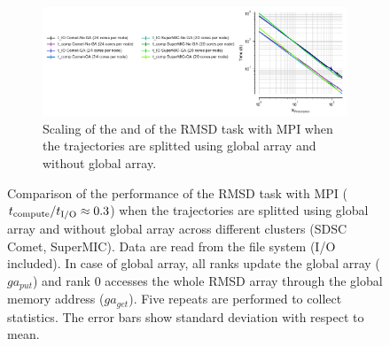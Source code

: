 \begin{figure}[ht!]
\begin{subfigure} {.8\textwidth}
  \includegraphics[width=\linewidth]{figures/Clusters_IO_compute_scaling_splitting.pdf}
  \caption{Scaling of the \tcomp and \tIO of the RMSD task with MPI when the trajectories are splitted using global array and without global array.}
  \label{fig:compute-IO-scaling-clusters-splitting}
\end{subfigure}
%
\caption{Comparison of the performance of the RMSD task with MPI (${t}_{\text{compute}}/{t}_{\text{I/O}} \approx 0.3$) when the trajectories are splitted using global 
array and without global array across different clusters (SDSC Comet, SuperMIC). Data are read from the file system (I/O included).
In case of global array, all ranks update the global array ($ga_{put}$) and rank 0 accesses the whole RMSD array through the global memory address ($ga_{get}$).
Five repeats are performed to collect statistics. The error bars show standard deviation with respect to mean. }
\label{fig:MPI-splitting-clusters}
\end{figure} 

